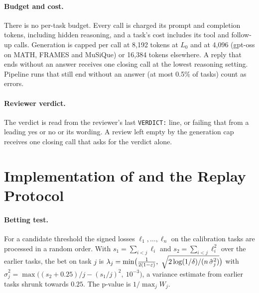 \paragraph{Budget and cost.} There is no per-task budget. Every call is charged its prompt and completion
tokens, including hidden reasoning, and a task's cost includes its tool and follow-up calls. Generation is
capped per call at 8{,}192 tokens at $L_0$ and at 4{,}096 (gpt-oss on MATH, FRAMES and MuSiQue) or 16{,}384
tokens elsewhere. A reply that ends without an answer receives one closing call at the lowest reasoning
setting. Pipeline runs that still end without an answer (at most 0.5\% of tasks) count as errors.

\paragraph{Reviewer verdict.} The verdict is read from the reviewer's last \texttt{VERDICT:} line, or failing
that from a leading yes or no or its wording. A review left empty by the generation cap receives one closing
call that asks for the verdict alone.

\section{Implementation of \climb{} and the Replay Protocol}
\label{app:impl}



\paragraph{Betting test.} For a candidate threshold the signed losses $\ell_1, \dots, \ell_n$ on the
calibration tasks are processed in a random order. With $s_1 = \sum_{i<j}\ell_i$ and
$s_2 = \sum_{i<j}\ell_i^2$ over the earlier tasks, the bet on task $j$ is
$\lambda_j = \min\!\big(\tfrac{1}{2(1-\varepsilon)},\ \sqrt{2\log(1/\delta) / (n\,\hat\sigma^2_j)}\big)$ with
$\hat\sigma^2_j = \max\big((s_2 + 0.25)/j - (s_1/j)^2,\ 10^{-3}\big)$, a variance estimate from earlier
tasks shrunk towards $0.25$. The p-value is $1/\max_j W_j$.

